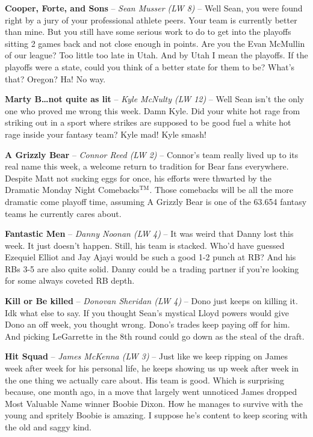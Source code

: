 \documentclass[11pt,letterpaper]{article}
\begin{document}
\begin{etaremune}
\item \textbf{Cooper, Forte, and Sons} -- \textit{Sean Musser (LW 8)} -- Well Sean, you were found right by a jury of your professional athlete peers. Your team is currently better than mine. But you still have some serious work to do to get into the playoffs sitting 2 games back and not close enough in points. Are you the Evan McMullin of our league? Too little too late in Utah. And by Utah I mean the playoffs. If the playoffs were a state, could you think of a better state for them to be? What's that? Oregon? Ha! No way.
\item \textbf{Marty B\dots not quite as lit} -- \textit{Kyle McNulty (LW 12)} -- Well Sean isn't the only one who proved me wrong this week. Damn Kyle. Did your white hot rage from striking out in a sport where strikes are supposed to be good fuel a white hot rage inside your fantasy team? Kyle mad! Kyle smash! 
\item \textbf{A Grizzly Bear} -- \textit{Connor Reed (LW 2)} -- Connor's team really lived up to its real name this week, a welcome return to tradition for Bear fans everywhere. Despite Matt not sucking eggs for once, his efforts were thwarted by the Dramatic Monday Night Comebacks$^{\text{TM}}$. Those comebacks will be all the more dramatic come playoff time, assuming A Grizzly Bear is one of the 63.654 fantasy teams he currently cares about.
\item \textbf{Fantastic Men} -- \textit{Danny Noonan (LW 4)} -- It was weird that Danny lost this week. It just doesn't happen. Still, his team is stacked. Who'd have guessed Ezequiel Elliot and Jay Ajayi would be such a good 1-2 punch at RB? And his RBs 3-5 are also quite solid. Danny could be a trading partner if you're looking for some always coveted RB depth.
\item \textbf{Kill or Be killed} -- \textit{Donovan Sheridan (LW 4)} -- Dono just keeps on killing it. Idk what else to say. If you thought Sean's mystical Lloyd powers would give Dono an off week, you thought wrong. Dono's trades keep paying off for him. And picking LeGarrette in the 8th round could go down as the steal of the draft.
\item \textbf{Hit Squad} -- \textit{James McKenna (LW 3)} -- Just like we keep ripping on James week after week for his personal life, he keeps showing us up week after week in the one thing we actually care about. His team is good. Which is surprising because, one month ago, in a move that largely went unnoticed James dropped Most Valuable Name winner Boobie Dixon. How he manages to survive with the young and spritely Boobie is amazing. I suppose he's content to keep scoring with the old and saggy kind.

\end{etaremune}
\end{document}
